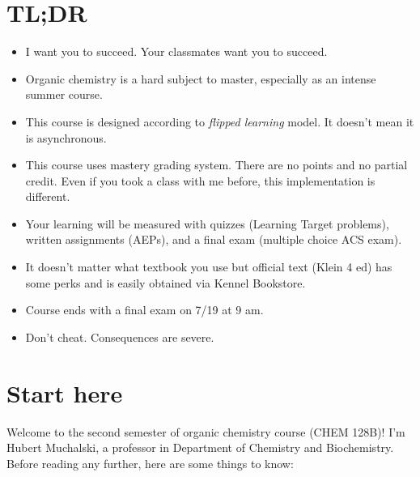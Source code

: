 \hypertarget{tldr}{%
\section{TL;DR}\label{tldr}}

\begin{itemize}
\tightlist
\item
  I want you to succeed. Your classmates want you to succeed.
\item
  Organic chemistry is a hard subject to master, especially as an
  intense summer course.
\item
  This course is designed according to \emph{flipped learning} model. It
  doesn't mean it is asynchronous.
\item
  This course uses mastery grading system. There are no points and no
  partial credit. Even if you took a class with me before, this
  implementation is different.
\item
  Your learning will be measured with quizzes (Learning Target
  problems), written assignments (AEPs), and a final exam (multiple
  choice ACS exam).
\item
  It doesn't matter what textbook you use but official text (Klein 4 ed)
  has some perks and is easily obtained via Kennel Bookstore.
\item
  Course ends with a final exam on 7/19 at 9 am.
\item
  Don't cheat. Consequences are severe.
\end{itemize}

\hypertarget{start-here}{%
\section{Start here}\label{start-here}}

Welcome to the second semester of organic chemistry course (CHEM 128B)!
I'm Hubert Muchalski, a professor in Department of Chemistry and
Biochemistry. Before reading any further, here are some things to know:

